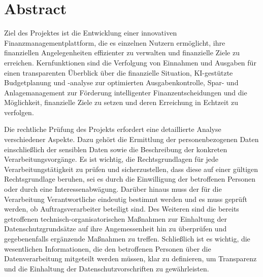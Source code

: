 \chapter{Abstract}

Ziel des Projektes ist die Entwicklung einer innovativen Finanzmanagementplattform, die es einzelnen Nutzern ermöglicht, ihre finanziellen Angelegenheiten effizienter
zu verwalten und finanzielle Ziele zu erreichen. Kernfunktionen sind die Verfolgung von Einnahmen und Ausgaben für einen transparenten Überblick über die finanzielle Situation, KI-gestützte Budgetplanung und -analyse zur optimierten Ausgabenkontrolle, Spar- und Anlagemanagement zur Förderung intelligenter Finanzentscheidungen und die Möglichkeit, finanzielle Ziele zu setzen und deren Erreichung in Echtzeit zu verfolgen.

Die rechtliche Prüfung des Projekts erfordert eine detaillierte Analyse verschiedener Aspekte. Dazu gehört die Ermittlung der personenbezogenen Daten einschließlich der sensiblen Daten sowie die Beschreibung der konkreten Verarbeitungsvorgänge. Es ist wichtig, die Rechtsgrundlagen für jede Verarbeitungstätigkeit zu prüfen und sicherzustellen, dass diese auf einer gültigen Rechtsgrundlage beruhen, sei es durch die Einwilligung der betroffenen Personen oder durch eine Interessenabwägung. Darüber hinaus muss der für die Verarbeitung Verantwortliche eindeutig bestimmt werden und es muss geprüft werden, ob Auftragsverarbeiter beteiligt sind. Des Weiteren sind die bereits getroffenen technisch-organisatorischen Maßnahmen zur Einhaltung der Datenschutzgrundsätze auf ihre Angemessenheit hin zu überprüfen und gegebenenfalls ergänzende Maßnahmen zu treffen. Schließlich ist es wichtig, die wesentlichen Informationen, die den betroffenen Personen über die Datenverarbeitung mitgeteilt werden müssen, klar zu definieren, um Transparenz und die Einhaltung der Datenschutzvorschriften zu gewährleisten.